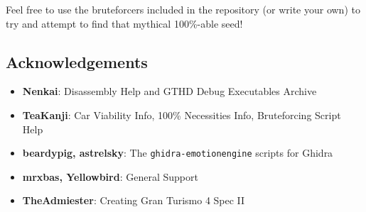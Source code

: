\documentclass[12pt,a4paper,notitlepage]{extarticle}
\begin{document}
            Feel free to use the bruteforcers included in the repository (or write your own) to
            try and attempt to find that mythical 100\%-able seed!

        \subsection*{Acknowledgements}
            \small{
                \begin{itemize}
                    \item \textbf{Nenkai}: Disassembly Help and GTHD Debug Executables Archive
                    \item \textbf{TeaKanji}: Car Viability Info, 100\% Necessities Info,
                    Bruteforcing Script Help
                    \item \textbf{beardypig, astrelsky}: The \texttt{ghidra-emotionengine} scripts
                    for Ghidra
                    \item \textbf{mrxbas, Yellowbird}: General Support
                    \item \textbf{TheAdmiester}: Creating Gran Turismo 4 Spec II
                \end{itemize}
            }
\end{document}
